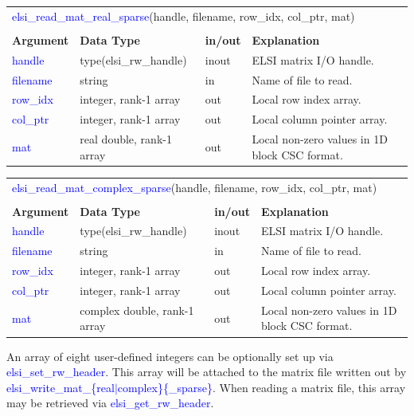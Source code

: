\documentclass{report}
\newcommand{\tcb}[1]{\textcolor{blue}{#1}}
\begin{document}
\begin{tabular}[]{|p{20mm}|p{45mm}|p{15mm}|p{85mm}|}
\multicolumn{4}{l}{\tcb{elsi\_read\_mat\_real\_sparse}(handle, filename, row\_idx, col\_ptr, mat)}\\
\multicolumn{4}{l}{}\\
\hline
\multicolumn{1}{|l|}{\textbf{Argument}} & \multicolumn{1}{l|}{\textbf{Data Type}} & \multicolumn{1}{l|}{\textbf{in/out}} & \multicolumn{1}{l|}{\textbf{Explanation}}\\
\hline
\tcb{handle}   & type(elsi\_rw\_handle)    & inout & ELSI matrix I/O handle.\\
\hline
\tcb{filename} & string                    & in    & Name of file to read.\\
\hline
\tcb{row\_idx} & integer, rank-1 array     & out   & Local row index array.\\
\hline
\tcb{col\_ptr} & integer, rank-1 array     & out   & Local column pointer array.\\
\hline
\tcb{mat}      & real double, rank-1 array & out   & Local non-zero values in 1D block CSC format.\\
\hline
\end{tabular}

\begin{tabular}[]{|p{20mm}|p{45mm}|p{15mm}|p{85mm}|}
\multicolumn{4}{l}{\tcb{elsi\_read\_mat\_complex\_sparse}(handle, filename, row\_idx, col\_ptr, mat)}\\
\multicolumn{4}{l}{}\\
\hline
\multicolumn{1}{|l|}{\textbf{Argument}} & \multicolumn{1}{l|}{\textbf{Data Type}} & \multicolumn{1}{l|}{\textbf{in/out}} & \multicolumn{1}{l|}{\textbf{Explanation}}\\
\hline
\tcb{handle}   & type(elsi\_rw\_handle)       & inout & ELSI matrix I/O handle.\\
\hline
\tcb{filename} & string                       & in    & Name of file to read.\\
\hline
\tcb{row\_idx} & integer, rank-1 array        & out   & Local row index array.\\
\hline
\tcb{col\_ptr} & integer, rank-1 array        & out   & Local column pointer array.\\
\hline
\tcb{mat}      & complex double, rank-1 array & out   & Local non-zero values in 1D block CSC format.\\
\hline
\end{tabular}

An array of eight user-defined integers can be optionally set up via \tcb{elsi\_set\_rw\_header}. This array will be attached to the matrix file written out by \tcb{elsi\_write\_mat\_\{real$\vert$complex\}\{\_sparse\}}. When reading a matrix file, this array may be retrieved via \tcb{elsi\_get\_rw\_header}.
\end{document}
